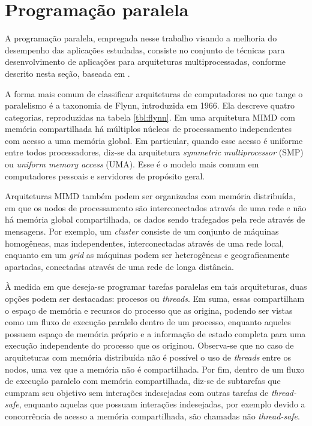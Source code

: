 \documentclass[cic,tc]{iiufrgs}
\begin{document}
\section{Programação paralela}
\label{sec:par}

A programação paralela, empregada nesse trabalho visando a melhoria do
desempenho das aplicações estudadas, consiste no conjunto de técnicas para
desenvolvimento de aplicações para arquiteturas multiprocessadas, conforme
descrito nesta seção, baseada em \cite{el2005advanced}.

A forma mais comum de classificar arquiteturas de computadores no que tange o
paralelismo é a taxonomia de Flynn, introduzida em 1966. Ela descreve quatro
categorias, reproduzidas na tabela \ref{tbl:flynn}. Em uma arquitetura MIMD com
memória compartilhada há múltiplos núcleos de processamento independentes com
acesso a uma memória global. Em particular, quando esse acesso é uniforme entre
todos processadores, diz-se da arquitetura \textit{symmetric multiprocessor}
(SMP) ou \textit{uniform memory access} (UMA). Esse é o modelo mais comum em
computadores pessoais e servidores de propósito geral.

Arquiteturas MIMD também podem ser organizadas com memória distribuída, em que
os nodos de processamento são interconectados através de uma rede e não há
memória global compartilhada, os dados sendo trafegados pela rede através de
mensagens. Por exemplo, um \textit{cluster} consiste de um conjunto de máquinas
homogêneas, mas independentes, interconectadas através de uma rede local,
enquanto em um \textit{grid} as máquinas podem ser heterogêneas e
geograficamente apartadas, conectadas através de uma rede de longa distância.

À medida em que deseja-se programar tarefas paralelas em tais arquiteturas,
duas opções podem ser destacadas: procesos ou \textit{threads}. Em suma, essas
compartilham o espaço de memória e recursos do processo que as origina, podendo
ser vistas como um fluxo de execução paralelo dentro de um processo, enquanto
aqueles possuem espaço de memória próprio e a informação de estado completa
para uma execução independente do processo que os originou. Observa-se que no
caso de arquiteturas com memória distribuída não é possível o uso de
\textit{threads} entre os nodos, uma vez que a memória não é compartilhada.
Por fim, dentro de um fluxo de execução paralelo com memória compartilhada,
diz-se de subtarefas que cumpram seu objetivo sem interações indesejadas com
outras tarefas de \textit{thread-safe}, enquanto aquelas que possuam interações
indesejadas, por exemplo devido a concorrência de acesso a memória
compartilhada, são chamadas não \textit{thread-safe}.
\end{document}
